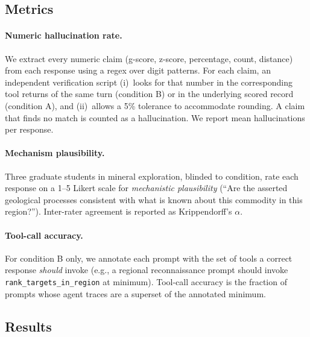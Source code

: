 \documentclass[11pt]{article}
\begin{document}
\subsection{Metrics}

\paragraph{Numeric hallucination rate.}
We extract every numeric claim (g-score, z-score, percentage, count,
distance) from each response using a regex over digit patterns. For
each claim, an independent verification script (i)~looks for that
number in the corresponding tool returns of the same turn (condition
B) or in the underlying scored record (condition A), and (ii)~allows
a 5\% tolerance to accommodate rounding. A claim that finds no match
is counted as a hallucination. We report mean hallucinations per
response.

\paragraph{Mechanism plausibility.}
Three graduate students in mineral exploration, blinded to
condition, rate each response on a 1--5 Likert scale for
\emph{mechanistic plausibility} (``Are the asserted geological
processes consistent with what is known about this commodity in this
region?''). Inter-rater agreement is reported as Krippendorff's
$\alpha$.

\paragraph{Tool-call accuracy.}
For condition B only, we annotate each prompt with the set of tools a
correct response \emph{should} invoke (e.g., a regional reconnaissance
prompt should invoke \texttt{rank\_targets\_in\_region} at minimum).
Tool-call accuracy is the fraction of prompts whose agent traces are
a superset of the annotated minimum.

\subsection{Results}
\end{document}
